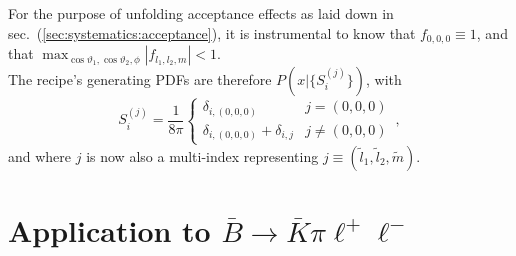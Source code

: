 \documentclass[aps,nofootinbib,preprintnumbers,prd,twocolumn]{revtex4-1}
\newcommand{\refsec}[1]{sec.~(\ref{sec:#1})}
\renewcommand{\theta}{\vartheta}
\begin{document}
For the purpose of unfolding acceptance effects as laid down in \refsec{systematics:acceptance}, it is instrumental
to know that $f_{0,0,0} \equiv 1$, and that $\max_{\cos\theta_1,\cos\theta_2,\phi} |f_{l_1, l_2, m}| < 1$.\\

The recipe's generating PDFs are therefore $P(x|\lbrace S_i^{(j)}\rbrace)$, with
\begin{equation}
    \label{eq:recipe:lambdabtolambdall}
        S_i^{(j)} = \frac{1}{8\pi}
        \begin{cases}
            \delta_{i,(0,0,0)}                  & j = (0, 0, 0)\\
            \delta_{i,(0,0,0)}  + \delta_{i,j}  & j \neq (0, 0, 0)
        \end{cases}\,,
\end{equation}
and where $j$ is now also a multi-index representing $j \equiv (\tilde l_1, \tilde l_2, \tilde m)$.

\section{Application to $\bar{B}\to\bar{K}\pi\ell^+\ell^-$}
\label{app:btokstarll}
\end{document}
